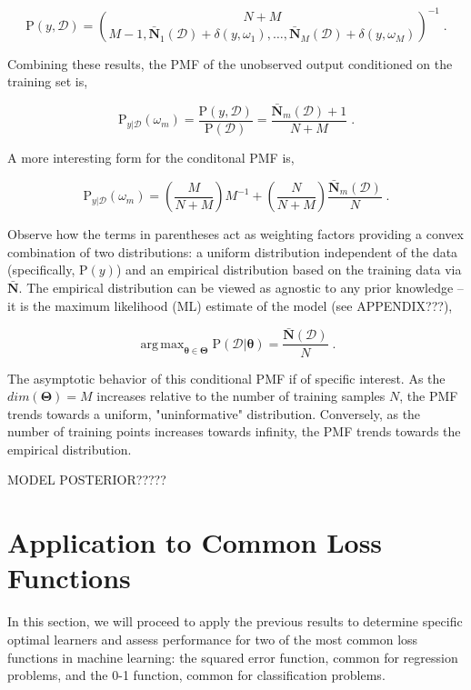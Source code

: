 \documentclass[12pt]{article}
\DeclareMathOperator*{\argmax}{arg\,max}
\begin{document}
\begin{equation}
\text{P}(y,\mathcal{D}) = \binom{N+M}{M-1,\bar{\bm{N}}_1(\mathcal{D})+\delta(y,\omega_1),\ldots,\bar{\bm{N}}_M(\mathcal{D})+\delta(y,\omega_M)}^{-1} \;.
\end{equation}

Combining these results, the PMF of the unobserved output conditioned on the training set is,

\begin{equation}
\text{P}_{y|\mathcal{D}}(\omega_m) = \frac{\text{P}(y,\mathcal{D})}{\text{P}(\mathcal{D})} = \frac{\bar{\bm{N}}_m(\mathcal{D})+1}{N+M} \;.
\end{equation}

A more interesting form for the conditonal PMF is,

\begin{equation}
\text{P}_{y|\mathcal{D}}(\omega_m) = \left(\frac{M}{N+M}\right) M^{-1} + \left(\frac{N}{N+M}\right) \frac{\bar{\bm{N}}_m(\mathcal{D})}{N} \;.
\end{equation}

Observe how the terms in parentheses act as weighting factors providing a convex combination of two distributions: a uniform distribution independent of the data (specifically, $\text{P}(y)$) and an empirical distribution based on the training data via $\bar{\bm{N}}$. The empirical distribution can be viewed as agnostic to any prior knowledge -- it is the maximum likelihood (ML) estimate of the model (see APPENDIX???),

\begin{equation}
\argmax_{\bm{\theta} \in \bm{\Theta}} \text{P}(\mathcal{D} | \bm{\theta}) = \frac{\bar{\bm{N}}(\mathcal{D})}{N} \;.
\end{equation}

The asymptotic behavior of this conditional PMF if of specific interest. As the $dim(\bm{\Theta}) = M$ increases relative to the number of training samples $N$, the PMF trends towards a uniform, "uninformative" distribution. Conversely, as the number of training points increases towards infinity, the PMF trends towards the empirical distribution. 

MODEL POSTERIOR?????




\section{Application to Common Loss Functions}

In this section, we will proceed to apply the previous results to determine specific optimal learners and assess performance for two of the most common loss functions in machine learning: the squared error function, common for regression problems, and the 0-1 function, common for classification problems. 
\end{document}
